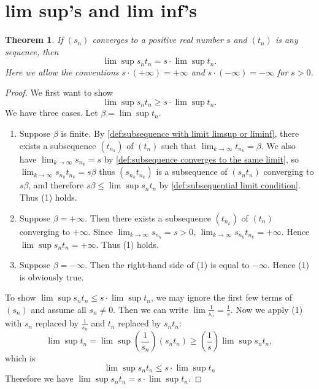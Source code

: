 \documentclass[12pt, lettersize]{book}
\theoremstyle{plain}
\newtheorem{thm}{Theorem}[section]
\theoremstyle{definition}
\theoremstyle{remark}
\begin{document}
	\section{lim sup's and lim inf's}
		\setcounter{equation}{0}
		\begin{thm}\label{thm:12.1}
		If $(s_n)$ converges to a positive real number $s$ and $(t_n)$ is any sequence, then
		\begin{displaymath}
			\lim\sup s_nt_n=s\cdot\lim\sup t_n.
		\end{displaymath}
		Here we allow the conventions $s\cdot(+\infty)=+\infty$ and $s\cdot(-\infty)=-\infty$ for $s>0$.
		\end{thm}
		\begin{proof}
		We first want to show
		\begin{equation}
			\lim\sup s_nt_n\geq s\cdot\lim\sup t_n.
		\end{equation}
		We have three cases. Let $\beta=\lim\sup t_n$.
		\begin{enumerate}
			\item Suppose $\beta$ is finite. By \ref{def:subsequence with limit limsup or liminf}, there exists a subsequence
			$(t_{n_k})$ of $(t_n)$ such that $\lim_{k\rightarrow\infty}t_{n_k}=\beta$. We also have $\lim_{k\rightarrow\infty}s_{n_k}=s$ by \ref{def:subsequence converges to the same limit}, so $\lim_{k\rightarrow\infty}s_{n_k}t_{n_k}=s\beta$ thus $(s_{n_k}t_{n_k})$ is a subsequence of $(s_nt_n)$ converging to $s\beta$, and therefore $s\beta\leq\lim\sup s_nt_n$ by \ref{def:subsequential limit condition}. Thus (1) holds.
			\item Suppose $\beta=+\infty$. Then there exists a subsequence $(t_{n_k})$ of $(t_n)$ converging to $+\infty$.
			Since $\lim_{k\rightarrow\infty}s_{n_k}=s>0$, $\lim_{k\rightarrow\infty}s_{n_k}t_{n_k}=+\infty$. Hence $\lim\sup s_nt_n=+\infty$. Thus (1) holds.
			\item Suppose $\beta=-\infty$. Then the right-hand side of (1) is equal to $-\infty$. Hence (1) is obviously true.	
		\end{enumerate}
		To show $\lim\sup s_nt_n\leq s\cdot\lim\sup t_n$, we may ignore the first few terms of $(s_n)$ and assume all $s_n\neq0$. Then we can write $\lim\frac{1}{s_n}=\frac{1}{s}$. Now we apply (1) with $s_n$ replaced by $\frac{1}{s_n}$ and $t_n$ replaced by $s_nt_n$:
		\begin{displaymath}
			\lim\sup t_n=\lim\sup(\frac{1}{s_n})(s_nt_n)\geq(\frac{1}{s})\lim\sup s_nt_n,
		\end{displaymath}
		which is 
		\begin{displaymath}
			\lim\sup s_nt_n\leq s\cdot\lim\sup t_n
		\end{displaymath}
		Therefore we have $\lim\sup s_nt_n=s\cdot\lim\sup t_n$.
		\end{proof}
		
\end{document}

